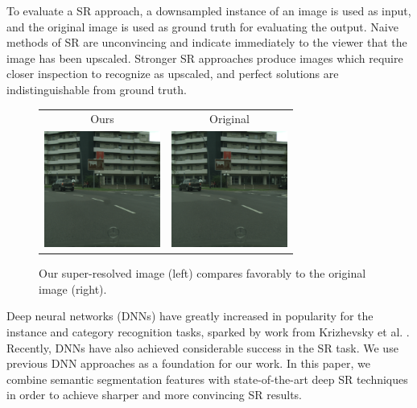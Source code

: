\documentclass[10pt,twocolumn,letterpaper]{article}
\begin{document}
To evaluate a SR approach, a downsampled instance of an image is used as input,
and the original image is used as ground truth for evaluating the output. Naive
methods of SR are unconvincing and indicate immediately to the viewer that the
image has been upscaled. Stronger SR approaches produce images which require
closer inspection to recognize as upscaled, and perfect solutions are
indistinguishable from ground truth.

\begin{figure}[ht]
    \begin{tabular}{cc}
        Ours & Original \\
        \includegraphics[trim=0 0 0 0, clip,
            width=1.5in]{images/example_hr_image.png} &
        \includegraphics[trim=0 0 0 0, clip,
            width=1.5in]{images/example_hr_image.png} \\
    \end{tabular}
    \caption{Our super-resolved image (left) compares favorably to the original
    image (right).}
    \label{fig:exampleIntroFirst}
\end{figure}

Deep neural networks (DNNs) have greatly increased in popularity for the
instance and category recognition tasks, sparked by work from Krizhevsky et al.
\cite{AlexNet}. Recently, DNNs have also achieved considerable success in the
SR task. We use previous DNN approaches as a foundation for our work. In this
paper, we combine semantic segmentation features with state-of-the-art deep SR
techniques in order to achieve sharper and more convincing SR results.
\end{document}
